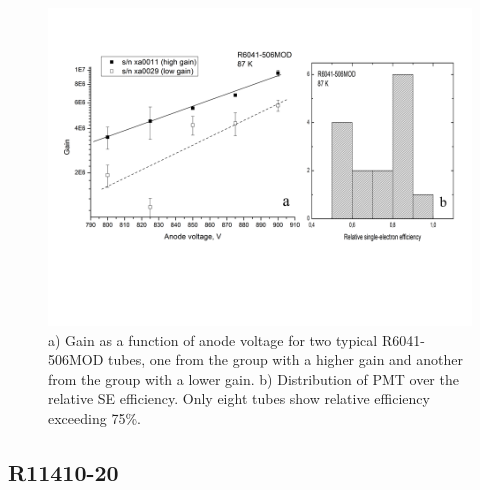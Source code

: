 \documentclass[a4paper,11pt]{article}
\begin{document}
\begin{figure}[htbp]
\centering
\includegraphics[width=1.0\textwidth,viewport=1 100 700 500,clip]{figures/R6041gaineff.png}
\caption{a) Gain as a function of anode voltage for two typical R6041-506MOD tubes, one from the group with a higher gain 
and another from the group with a lower gain. 
b) Distribution of PMT over the relative SE efficiency. Only eight tubes show relative efficiency exceeding 75\%.  }
\label{fig:R6041gaineff}
\end{figure}

\subsection{R11410-20}
\end{document}
